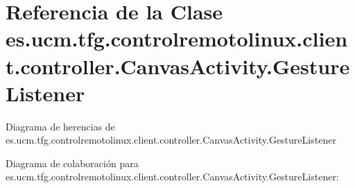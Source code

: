 \hypertarget{classes_1_1ucm_1_1tfg_1_1controlremotolinux_1_1client_1_1controller_1_1CanvasActivity_1_1GestureListener}{\section{Referencia de la Clase es.\-ucm.\-tfg.\-controlremotolinux.\-client.\-controller.\-Canvas\-Activity.\-Gesture\-Listener}
\label{classes_1_1ucm_1_1tfg_1_1controlremotolinux_1_1client_1_1controller_1_1CanvasActivity_1_1GestureListener}
}


Diagrama de herencias de es.\-ucm.\-tfg.\-controlremotolinux.\-client.\-controller.\-Canvas\-Activity.\-Gesture\-Listener


Diagrama de colaboración para es.\-ucm.\-tfg.\-controlremotolinux.\-client.\-controller.\-Canvas\-Activity.\-Gesture\-Listener\-:
